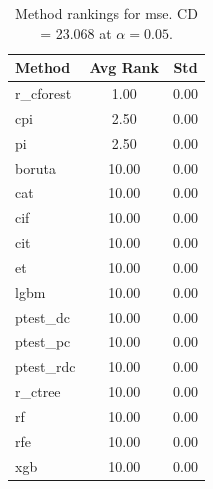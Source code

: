 \begin{table}[h]
\centering
\caption{Method rankings for mse. CD = 23.068 at $\alpha=0.05$.}
\label{tab:ranks_mse}
\begin{tabular}{lcc}
\toprule
Method & Avg Rank & Std \\
\midrule
r_cforest & 1.00 & 0.00 \\
cpi & 2.50 & 0.00 \\
pi & 2.50 & 0.00 \\
boruta & 10.00 & 0.00 \\
cat & 10.00 & 0.00 \\
cif & 10.00 & 0.00 \\
cit & 10.00 & 0.00 \\
et & 10.00 & 0.00 \\
lgbm & 10.00 & 0.00 \\
ptest_dc & 10.00 & 0.00 \\
ptest_pc & 10.00 & 0.00 \\
ptest_rdc & 10.00 & 0.00 \\
r_ctree & 10.00 & 0.00 \\
rf & 10.00 & 0.00 \\
rfe & 10.00 & 0.00 \\
xgb & 10.00 & 0.00 \\
\bottomrule
\end{tabular}
\end{table}